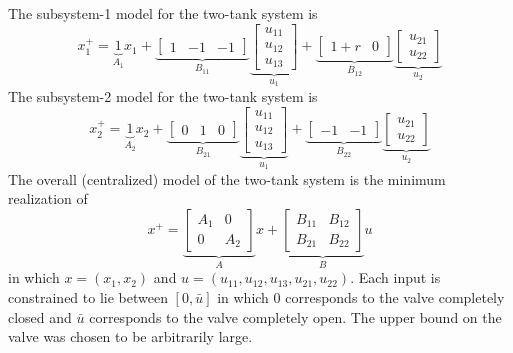 The subsystem-1 model for the two-tank system is
\begin{equation}
x_1^+ = \underbrace{1}_{A_{1}}x_1 + \underbrace{\begin{bmatrix}1 &-1 
  &-1\end{bmatrix}}_{B_{11}}\underbrace{\begin{bmatrix}u_{11}\\u_{12}\\u_{13}\end{bmatrix}}_{u_1}
+\underbrace{\begin{bmatrix}1+r &0
    \end{bmatrix}}_{B_{12}}\underbrace{\begin{bmatrix}u_{21}\\u_{22}\end{bmatrix}}_{u_2}
\end{equation}
The subsystem-2 model for the two-tank system is
\begin{equation}
x_2^+ = \underbrace{1}_{A_{2}}x_2 +
\underbrace{\begin{bmatrix}0&1&0\end{bmatrix}}_{B_{21}}\underbrace{\begin{bmatrix}u_{11}\\u_{12}\\u_{13}\end{bmatrix}}_{u_1}
 +\underbrace{\begin{bmatrix}-1&-1\end{bmatrix}}_{B_{22}}\underbrace{\begin{bmatrix}u_{21}\\u_{22}\end{bmatrix}}_{u_2}
\end{equation}
The overall (centralized) model of the two-tank system is the minimum
realization of
\begin{equation}
x^+ = \underbrace{\begin{bmatrix}A_1 &0\\0& A_2\end{bmatrix}}_{A}x
  + \underbrace{\begin{bmatrix}B_{11}&B_{12}\\B_{21} & B_{22} \end{bmatrix}}_{B} u
\end{equation}
in which $x = (x_1,x_2)$ and $u =
(u_{11},u_{12},u_{13},u_{21},u_{22})$.
Each input  is constrained to lie between $[0,\bar{u}]$ in which
$0$ corresponds to the valve  completely closed and $\bar{u}$
corresponds to the valve  completely open. The upper bound on the
valve was chosen to be arbitrarily large.

